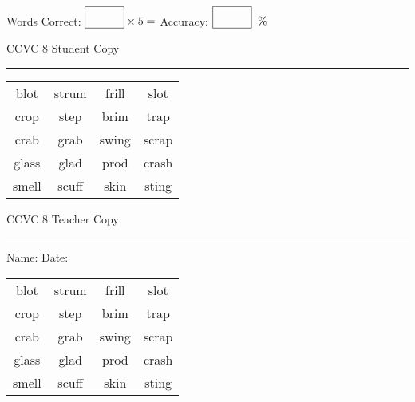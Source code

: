 \documentclass{memoir}
\begin{document}
\normalsize

Words Correct: $\fbox{\phantom{\huge 100}} \times 5 = $ Accuracy: $\fbox{\phantom{\huge 100}}\;\; \%$ 

\vfill

\newpage


\footnotesize \noindent
CCVC 8 \hfill Student Copy
\smallskip
\hrule

\Large

\setlength{\tabcolsep}{14pt}
\def\arraystretch{3}

{\selectfont


\begin{vplace}[0.5]
\begin{center}
\begin{tabular}{cccc}
blot & strum & frill & slot \\
crop & step & brim      & trap \\
crab        & grab                    & swing & scrap \\
glass & glad & prod & crash \\
smell & scuff & skin & sting \\
\end{tabular}
\end{center}
\end{vplace}

}

\newpage

\footnotesize \noindent
CCVC 8 \hfill Teacher Copy
\smallskip
\hrule

\normalsize

\vfill

\noindent
Name: \underline{\hspace{1.75in}} \hfill Date: \underline{\hspace{1in}}

\Large

{\selectfont


\begin{vplace}[0.5]
\begin{center}
\begin{tabular}{cccc}
blot & strum & frill & slot \\
crop & step & brim      & trap \\
crab        & grab                    & swing & scrap \\
glass & glad & prod & crash \\
smell & scuff & skin & sting \\
\end{tabular}
\end{center}
\end{vplace}



}
\end{document}
